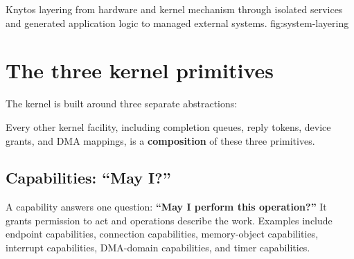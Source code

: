     {Knytos layering from hardware and kernel mechanism through isolated
    services and generated application logic to managed external systems.}
    {fig:system-layering}

\section{The three kernel primitives}

The kernel is built around three separate abstractions:

\begin{center}
\end{center}

Every other kernel facility, including completion queues, reply tokens, device
grants, and DMA mappings, is a \textbf{composition} of these three primitives.

\subsection{Capabilities: ``May I?''}

A capability answers one question: \textbf{``May I perform this operation?''}
It grants permission to act and operations describe the work. Examples include
endpoint capabilities, connection capabilities, memory-object capabilities,
interrupt capabilities, DMA-domain capabilities, and timer capabilities.

